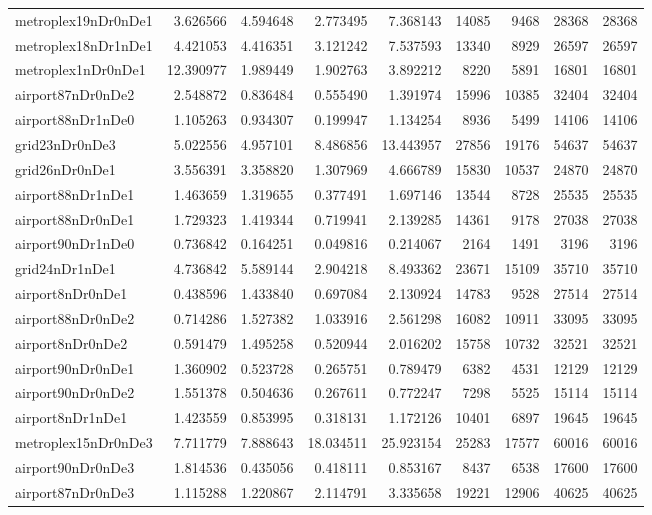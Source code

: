 \begin{longtable}{|l|r|r|r|r|r|r|r|r|}
metroplex19nDr0nDe1 & 3.626566 & 4.594648 & 2.773495 & 7.368143 & 14085 & 9468 & 28368 & 28368 \\
metroplex18nDr1nDe1 & 4.421053 & 4.416351 & 3.121242 & 7.537593 & 13340 & 8929 & 26597 & 26597 \\
metroplex1nDr0nDe1 & 12.390977 & 1.989449 & 1.902763 & 3.892212 & 8220 & 5891 & 16801 & 16801 \\
airport87nDr0nDe2 & 2.548872 & 0.836484 & 0.555490 & 1.391974 & 15996 & 10385 & 32404 & 32404 \\
airport88nDr1nDe0 & 1.105263 & 0.934307 & 0.199947 & 1.134254 & 8936 & 5499 & 14106 & 14106 \\
grid23nDr0nDe3 & 5.022556 & 4.957101 & 8.486856 & 13.443957 & 27856 & 19176 & 54637 & 54637 \\
grid26nDr0nDe1 & 3.556391 & 3.358820 & 1.307969 & 4.666789 & 15830 & 10537 & 24870 & 24870 \\
airport88nDr1nDe1 & 1.463659 & 1.319655 & 0.377491 & 1.697146 & 13544 & 8728 & 25535 & 25535 \\
airport88nDr0nDe1 & 1.729323 & 1.419344 & 0.719941 & 2.139285 & 14361 & 9178 & 27038 & 27038 \\
airport90nDr1nDe0 & 0.736842 & 0.164251 & 0.049816 & 0.214067 & 2164 & 1491 & 3196 & 3196 \\
grid24nDr1nDe1 & 4.736842 & 5.589144 & 2.904218 & 8.493362 & 23671 & 15109 & 35710 & 35710 \\
airport8nDr0nDe1 & 0.438596 & 1.433840 & 0.697084 & 2.130924 & 14783 & 9528 & 27514 & 27514 \\
airport88nDr0nDe2 & 0.714286 & 1.527382 & 1.033916 & 2.561298 & 16082 & 10911 & 33095 & 33095 \\
airport8nDr0nDe2 & 0.591479 & 1.495258 & 0.520944 & 2.016202 & 15758 & 10732 & 32521 & 32521 \\
airport90nDr0nDe1 & 1.360902 & 0.523728 & 0.265751 & 0.789479 & 6382 & 4531 & 12129 & 12129 \\
airport90nDr0nDe2 & 1.551378 & 0.504636 & 0.267611 & 0.772247 & 7298 & 5525 & 15114 & 15114 \\
airport8nDr1nDe1 & 1.423559 & 0.853995 & 0.318131 & 1.172126 & 10401 & 6897 & 19645 & 19645 \\
metroplex15nDr0nDe3 & 7.711779 & 7.888643 & 18.034511 & 25.923154 & 25283 & 17577 & 60016 & 60016 \\
airport90nDr0nDe3 & 1.814536 & 0.435056 & 0.418111 & 0.853167 & 8437 & 6538 & 17600 & 17600 \\
airport87nDr0nDe3 & 1.115288 & 1.220867 & 2.114791 & 3.335658 & 19221 & 12906 & 40625 & 40625 \\

\end{longtable}
